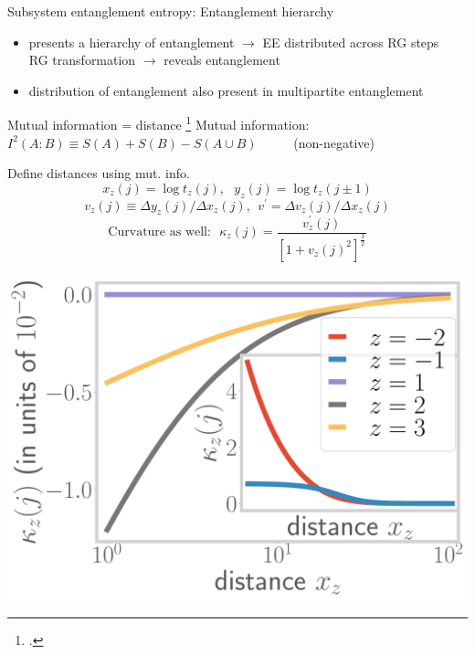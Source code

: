 \documentclass[8pt,aspectratio=169]{beamer}
\newcommand{\nitem}{\item[\ding{51}]}
\begin{document}
\begin{frame}{Subsystem entanglement entropy: Entanglement hierarchy}
\vspace*{\fill}

\begin{itemize}
	\nitem 
presents a \alert{hierarchy} of entanglement \(\longrightarrow\) EE distributed across RG steps\\
RG transformation \(\longrightarrow\) reveals entanglement

\vspace*{\fill}
\nitem distribution of entanglement also present in \alert{multipartite} entanglement
\end{itemize}

\end{frame}

\begin{frame}{Mutual information = distance}
\footcite{van2010building,lee2016,anirban_mott_2022,lee2010,lee2014,qi2013,lee2016,anirbanurg1,anirbanurg2,ryu2006,ryu2006aspects,nozaki2012}
\alert{Mutual information}: ~ \(I^2(A:B) \equiv S(A) + S(B) - S(A \cup B)\) ~ ~ ~ (non-negative)\\[10pt]

	\begin{minipage}{0.5\textwidth}
	Define distances using mut. info.
	\[x_z(j) = \log t_z(j),~ ~ ~y_z(j) = \log t_z(j \pm 1)\]
	\[v_z(j) \equiv \Delta y_z(j)/\Delta x_z(j), ~~ v^\prime = \Delta v_z(j)/\Delta x_z(j)\]
	\[\text{Curvature as well:} ~ ~ ~\kappa_{z}(j) = \frac{v^\prime_z(j)}{\left[1 + v_z(j)^2\right]^\frac{3}{2}}\]
	\end{minipage}
	\begin{minipage}{0.49\textwidth}
		\includegraphics[width=\textwidth]{curvature-pos.pdf}
	\end{minipage}
\end{frame}
\end{document}
